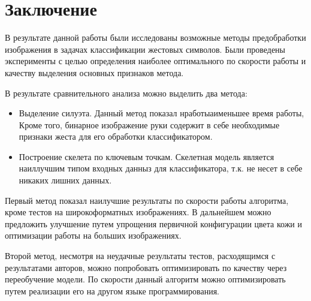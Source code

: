 \section{Заключение}
\label{sec:Conclusion}

В результате данной работы были исследованы возможные методы предобработки изображения в задачах классификации жестовых символов. Были проведены эксперименты с целью определения наиболее оптимального по скорости работы и качеству выделения основных признаков метода. 

В результате сравнительного анализа можно выделить два метода:

\begin{itemize}
	\item Выделение силуэта. Данный метод показал нработыаименьшее время работы, Кроме того, бинарное изображение руки содержит в себе необходимые признаки жеста для его обработки классификатором.
	\item Построение скелета по ключевым точкам. Скелетная модель является наиллучшим типом входных данныз для классификатора, т.к. не несет в себе никаких лишних данных\cite{10.1007/978-3-642-31298-4_16}.
\end{itemize}

Первый метод показал наилучшие результаты по скорости работы алгоритма, кроме тестов на широкоформатных изображениях. В дальнейшем можно предложить улучшение путем упрощения первичной конфигурации цвета кожи и оптимизации работы на больших изображениях.

Второй метод, несмотря на неудачные результаты тестов, расходящимся с результатами авторов\cite{DNN}, можно попробовать оптимизировать по качеству через переобучение модели. По скорости данный алгоритм можно оптимизировать путем реализации его на другом языке программирования.